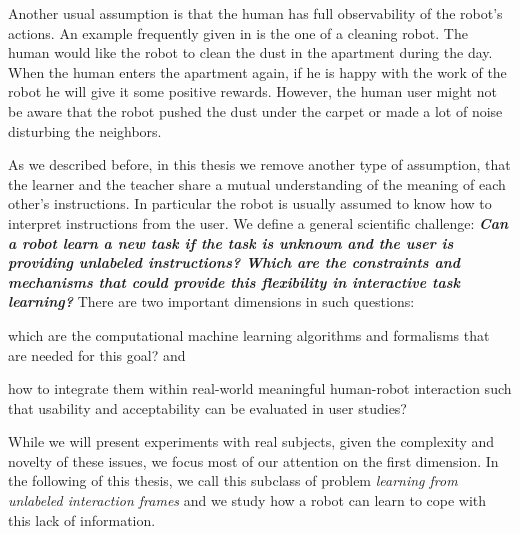 Another usual assumption is that the human has full observability of the robot's actions. An example frequently given in \cite{cederborg2014thesis} is the one of a cleaning robot. The human would like the robot to clean the dust in the apartment during the day. When the human enters the apartment again, if he is happy with the work of the robot he will give it some positive rewards. However, the human user might not be aware that the robot pushed the dust under the carpet or made a lot of noise disturbing the neighbors.


As we described before, in this thesis we remove another type of assumption, that the learner and the teacher share a mutual understanding of the meaning of each other's instructions.  In particular the robot is usually assumed to know how to interpret instructions from the user. We define a general scientific challenge: \textbf{\textit{Can a robot learn a new task if the task is unknown and the user is providing unlabeled instructions? Which are the constraints and mechanisms that could provide this flexibility in interactive task learning?}} There are two important dimensions in such questions: \begin{inparaenum} \item which are the computational machine learning algorithms and formalisms that are needed for this goal? and \item how to integrate them within real-world meaningful human-robot interaction such that usability and acceptability can be evaluated in user studies? \end{inparaenum}  While we will present experiments with real subjects, given the complexity and novelty of these issues, we focus most of our attention on the first dimension. In the following of this thesis, we call this subclass of problem \emph{learning from unlabeled interaction frames} and we study how a robot can learn to cope with this lack of information.

